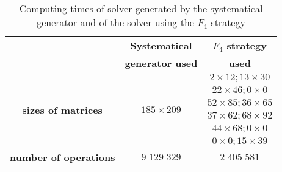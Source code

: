 ~\vfill
\begin{table}[ht]
  \centering
  \begin{tabular}{|c||cc|}
    \hline
    & \textbf{Systematical}    & \textbf{$F_4$ strategy} \\
    &  \textbf{generator used} & \textbf{used} \\
    \hline\hline
    
    \multirow{6}{*}{\textbf{sizes of matrices}} & \multirow{6}{*}{$185 \times 209$} & $2 \times 12; 13 \times 30$\\
     & & $22\times46; 0\times 0$\\
     & & $52\times85; 36\times 65$\\
     & & $37\times62; 68\times 92$\\
     & & $44\times68; 0\times 0$\\
     & & $0\times0; 15\times 39$\\
     \textbf{number of operations} & $9\;129\;329$ & $2\;405\;581$\\
    \hline
  \end{tabular}
  \caption{Computing times of solver generated by the systematical generator and of the solver using the $F_4$ strategy}
  \label{tab:gen}
\end{table}
\vfill
